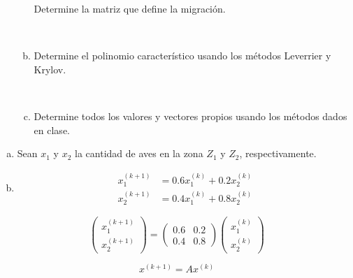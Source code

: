 \begin{frame}
\begin{enumerate}
\begin{enumerate}[a)]
			            Determine la matriz que define la migración.

			            \

			      \item

			            Determine el polinomio característico usando los
			            métodos Leverrier y Krylov.

			            \

			      \item

			            Determine todos los valores y vectores propios
			            usando los métodos dados en clase.
		      \end{enumerate}
	\end{enumerate}

	\begin{solution}
		\begin{enumerate}[a)]
			\item

			      Sean $x_{1}$ y $x_{2}$ la cantidad de aves en la zona
			      $Z_{1}$ y $Z_{2}$, respectivamente.

			\item
			      \begin{align*}
				      x^{\left(k+1\right)}_{1} & =
				      0.6x^{\left(k\right)}_{1}+
				      0.2x_{2}^{\left(k\right)}    \\
				      x^{\left(k+1\right)}_{2} & =
				      0.4x^{\left(k\right)}_{1}+
				      0.8x^{\left(k\right)}_{2}
			      \end{align*}
		\end{enumerate}

		\begin{equation*}
			\begin{pmatrix}
				x^{\left(k+1\right)}_{1} \\
				x^{\left(k+1\right)}_{2}
			\end{pmatrix}
			=
			\begin{pmatrix}
				0.6 & 0.2 \\
				0.4 & 0.8
			\end{pmatrix}
			\begin{pmatrix}
				x^{\left(k\right)}_{1} \\
				x^{\left(k\right)}_{2}
			\end{pmatrix}
		\end{equation*}

		\begin{equation*}
			x^{\left(k+1\right)}=
			Ax^{\left(k\right)}
		\end{equation*}
	\end{solution}
\end{frame}

